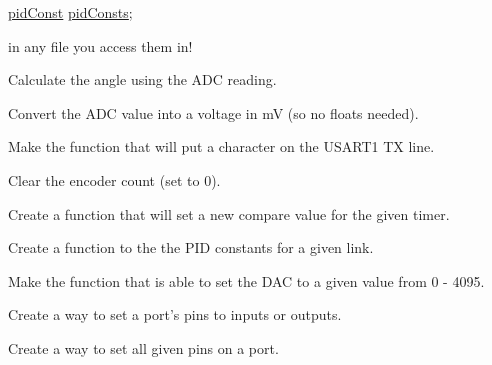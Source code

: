 \begin{DoxyRefList}
\begin{DoxyCode}
\hyperlink{structpid_const}{pidConst} \hyperlink{_p_i_d_8h_a4d2fc78b5924045bcc0e20fc95e18d97}{pidConsts}; 
\end{DoxyCode}
 in any file you access them in!  
\item[\label{todo__todo000021}%
\hypertarget{todo__todo000021}{}%
Global \hyperlink{pot_8h_a6572afa21880ee8fe8e834b7167e111b}{pot\-Angle} (int pot)]Calculate the angle using the A\-D\-C reading.  
\item[\label{todo__todo000022}%
\hypertarget{todo__todo000022}{}%
Global \hyperlink{pot_8h_ac8f71572a099805fc4cfcc793260e98b}{pot\-Volts} (int pot)]Convert the A\-D\-C value into a voltage in m\-V (so no floats needed).  
\item[\label{todo__todo000029}%
\hypertarget{todo__todo000029}{}%
Global \hyperlink{_u_s_a_r_t_debug_8c_ab52220b9802762326175f5a6d09c50a1}{put\-Char\-Debug} (char byte\-To\-Send)]Make the function that will put a character on the U\-S\-A\-R\-T1 T\-X line.  
\item[\label{todo__todo000013}%
\hypertarget{todo__todo000013}{}%
Global \hyperlink{_periph_8h_a9b159db17b7ebf680a2bdd169e269f85}{reset\-Enc\-Count} (int chan)]Clear the encoder count (set to 0).  
\item[\label{todo__todo000026}%
\hypertarget{todo__todo000026}{}%
Global \hyperlink{timer_8c_a3aa09ed8f7935a36b02d8cfb0d69821e}{set\-Comp\-Value} (unsigned char timer, unsigned long comp)]Create a function that will set a new compare value for the given timer.  
\item[\label{todo__todo000016}%
\hypertarget{todo__todo000016}{}%
Global \hyperlink{_p_i_d_8h_a2ffb511c1e18ce767f42422609dfa04d}{set\-Const} (char link, float Kp, float Ki, float Kd)]Create a function to the the P\-I\-D constants for a given link.  
\item[\label{todo__todo000004}%
\hypertarget{todo__todo000004}{}%
Global \hyperlink{_d_a_c_8h_af5aa1a81aa11a072a5ab582d040b3edf}{set\-D\-A\-C} (int D\-A\-Cn, int S\-P\-I\-Val)]Make the function that is able to set the D\-A\-C to a given value from 0 -\/ 4095.  
\item[\label{todo__todo000018}%
\hypertarget{todo__todo000018}{}%
Global \hyperlink{ports_8h_a1b62a36451c75cf20221c12f039ad6f4}{set\-Pins\-Dir} (char port, int dir, char num\-Pins,...)]Create a way to set a port's pins to inputs or outputs.  
\item[\label{todo__todo000020}%
\hypertarget{todo__todo000020}{}%
Global \hyperlink{ports_8h_afd809b04181b31d8567d95f070bb9034}{set\-Pins\-Val} (char port, int val, int num\-Pins,...)]Create a way to set all given pins on a port.  

\end{DoxyRefList}
